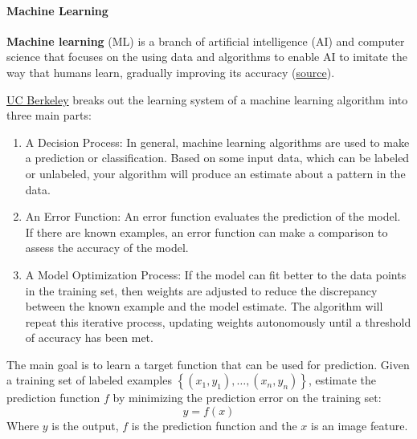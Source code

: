 \newpage

\paragraph{Machine Learning}

\begin{deepeningbox}
    \textbf{Machine learning} (ML) is a branch of artificial intelligence (AI) and computer science that focuses on the using data and algorithms to enable AI to imitate the way that humans learn, gradually improving its accuracy (\href{https://www.ibm.com/topics/machine-learning}{source}).

    \highspace
    \href{https://ischoolonline.berkeley.edu/blog/what-is-machine-learning/}{UC Berkeley} breaks out the learning system of a machine learning algorithm into three main parts:
    \begin{enumerate}
        \item A Decision Process: In general, machine learning algorithms are used to make a prediction or classification. Based on some input data, which can be labeled or unlabeled, your algorithm will produce an estimate about a pattern in the data.

        \item An Error Function: An error function evaluates the prediction of the model. If there are known examples, an error function can make a comparison to assess the accuracy of the model.

        \item A Model Optimization Process: If the model can fit better to the data points in the training set, then weights are adjusted to reduce the discrepancy between the known example and the model estimate. The algorithm will repeat this iterative  process, updating weights autonomously until a threshold of accuracy has been met.
    \end{enumerate}

    \highspace
    The main goal is to learn a target function that can be used for prediction. Given a training set of labeled examples $\left\{\left(x_{1}, y_{1}\right), \dots, \left(x_{n}, y_{n}\right)\right\}$, estimate the prediction function $f$ by minimizing the prediction error on the training set:
    \begin{equation*}
        y = f\left(x\right)
    \end{equation*}
    Where $y$ is the output, $f$ is the prediction function and the $x$ is an image feature.
\end{deepeningbox}

